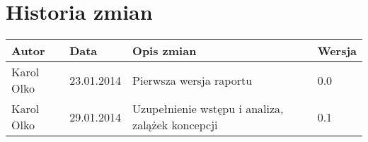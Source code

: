 \section{Historia zmian}
\begin{tabular}{ |C{0.15\textwidth}|C{0.15\textwidth}|C{0.55\textwidth}|C{0.15\textwidth}| }
\hline Autor & Data & Opis zmian & Wersja \\ 
\hline Karol Olko & 23.01.2014 & Pierwsza wersja raportu & 0.0 \\ 
\hline Karol Olko & 29.01.2014 & Uzupełnienie wstępu i analiza, zalążek koncepcji & 0.1 \\
\hline 
\end{tabular} 